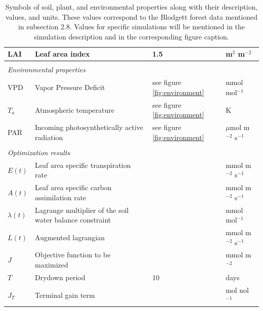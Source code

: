 \documentclass[utf8]{frontiersSCNS} %
\begin{document}
\begin{table}[h]
\begin{tabular}{l l l l}
        LAI & Leaf area index & 1.5 & m$^{2}$ m$^{-2}$\\
        \hline
        \multicolumn{4}{l}{}\\
        \multicolumn{4}{l}{\textit{Environmental properties}}\\
        \hline
        VPD & Vapor Pressure Deficit & see figure \ref{fig:environment} & mmol mol$^{-1}$\\
        $T_a$ & Atmospheric temperature & see figure \ref{fig:environment} & K \\
        PAR & Incoming photosynthetically active radiation & see figure \ref{fig:environment} & $\mu$mol m$^{-2}$ s$^{-1}$ \\
        \hline
        \multicolumn{4}{l}{}\\
        \multicolumn{4}{l}{\textit{Optimization results}}\\
        \hline
        $E(t)$ & Leaf area specific transpiration rate & & mmol m$^{-2}$ s$^{-1}$\\
        $A(t)$ & Leaf area specific carbon assimilation rate & & mmol m$^{-2}$ s$^{-1}$\\
        $\lambda (t)$ & Lagrange multiplier of the soil water balance constraint & & mmol mol$^{-1}$\\
        $L(t)$ & Augmented lagrangian & & mmol m$^{-2}$ s$^{-1}$\\
        $J$ & Objective function to be maximized & & mmol m$^{-2}$\\
        $T$ & Drydown period & 10 & days\\
        $J_T$ & Terminal gain term & & mol nol$^{-1}$\\
    \end{tabular}
    \caption{Symbols of soil, plant, and environmental properties along with their description, values, and units. These values correspond to the Blodgett forest data mentioned in subsection 2.8. Values for specific simulations will be mentioned in the simulation description and in the corresponding figure caption.}
    \label{tab:props}
\end{table}



\end{document}
